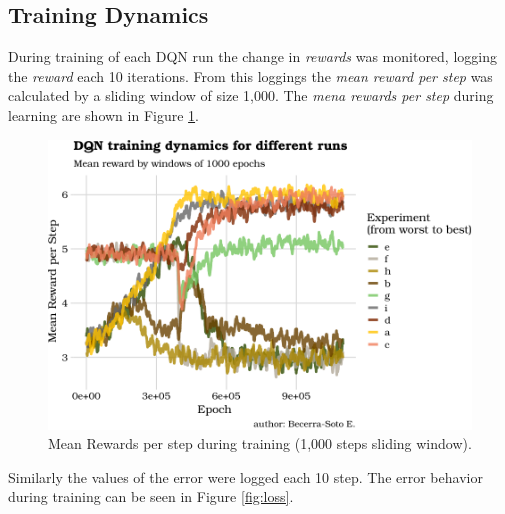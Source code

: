 \documentclass[
  openany]{book}
\begin{document}
\hypertarget{training-dynamics}{%
\subsection{Training Dynamics}\label{training-dynamics}}

During training of each DQN run the change in \emph{rewards} was monitored, logging the \emph{reward} each 10 iterations. From this loggings the \emph{mean reward per step} was calculated by a sliding window of size 1,000. The \emph{mena rewards per step} during learning are shown in Figure \ref{fig:reward-dynamics}.



\begin{figure}

{\centering \includegraphics{_main_files/figure-latex/reward-dynamics-1} 

}

\caption{Mean Rewards per step during training (1,000 steps sliding window).}\label{fig:reward-dynamics}
\end{figure}

Similarly the values of the error were logged each 10 step. The error behavior during training can be seen in Figure \ref{fig:loss}.
\end{document}
